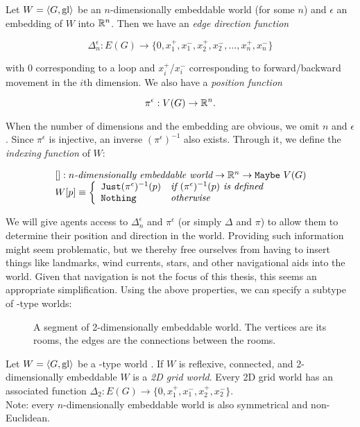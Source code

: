 \begin{definition}
Let $W = \langle G, \mathrm{gl} \rangle$ be an $n$-dimensionally embeddable world (for some $n$) and $\epsilon$ an embedding of $W$ into $\mathbb{R}^n$. Then we have an {\em edge direction function} 

$$\Delta_n^\epsilon : E(G) \rightarrow \{0,x_1^+,x_1^-,x_2^+,x_2^-,\dots,x_n^+,x_n^-\}$$

with $0$ corresponding to a loop and $x_i^+$/$x_i^-$ corresponding to forward/backward movement in the $i$th dimension. We also have a {\em position function}

$$\pi^\epsilon : V(G) \rightarrow \mathbb{R}^n.$$

When the number of dimensions and the embedding are obvious, we omit $n$ and $\epsilon$.
Since $\pi^\epsilon$ is injective, an inverse $(\pi^\epsilon)^{-1}$ also exists. Through it, we define the {\em indexing function} of $W$:

$$
	\begin{array}{l}
		[] : n\textit{-dimensionally embeddable world} \rightarrow \mathbb{R}^n \rightarrow \mathtt{Maybe}\ V(G)\\
		W[p] \equiv \left\{
			\begin{array}{l l}
				\mathtt{Just } (\pi^\epsilon)^{-1}(p) & \textit{if } (\pi^\epsilon)^{-1}(p) \textit{ is defined}\\
				\mathtt{Nothing} & \textit{otherwise}
			\end{array}
			\right.
	\end{array}
$$
\end{definition}

We will give agents access to $\Delta_n^\epsilon$ and $\pi^\epsilon$ (or simply $\Delta$ and $\pi$) to allow them to determine their position and direction in the world. Providing such information might seem problematic, but we thereby free ourselves from having to insert things like landmarks, wind currents, stars, and other navigational aids into the world. Given that navigation is not the focus of this thesis, this seems an appropriate simplification. Using the above properties, we can specify a subtype of \wext-type worlds:

\begin{figure}
	\centering
	
	\caption{A segment of 2-dimensionally embeddable world. The vertices are its rooms, the edges are the connections between the rooms.}
	\label{fig:2dgrid}
\end{figure}

\begin{definition}
	Let $W = \langle G,\mathrm{gl} \rangle$ be a \wext-type world . If $W$ is reflexive, connected, and 2-dimensionally embeddable $W$ is a {\em 2D grid world}.
	Every 2D grid world has an associated function $\Delta_2 : E(G) \rightarrow \{0,x_1^+,x_1^-,x_2^+,x_2^- \}$.\\
	Note: every $n$-dimensionally embeddable world is also symmetrical and non-Euclidean.
\end{definition}

